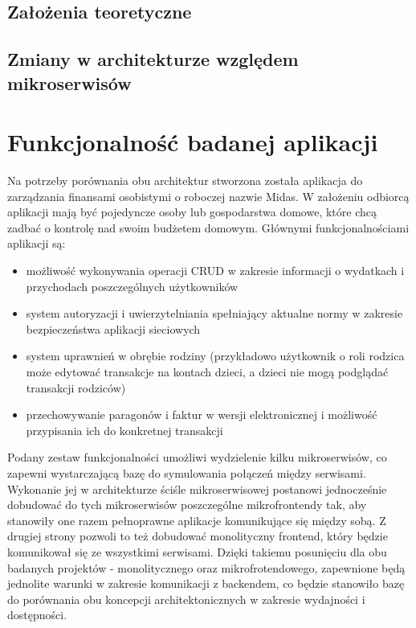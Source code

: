 \documentclass{SGGW-thesis}
\begin{document}
  \section{Założenia teoretyczne}
  \section{Zmiany w architekturze względem mikroserwisów}

\chapter{Funkcjonalność badanej aplikacji}
Na potrzeby porównania obu architektur stworzona została aplikacja do zarządzania finansami osobistymi o roboczej nazwie Midas. W założeniu odbiorcą aplikacji mają być pojedyncze osoby lub gospodarstwa domowe, które chcą zadbać o kontrolę nad swoim budżetem domowym. Głównymi funkcjonalnościami aplikacji są:

  \begin{itemize}
    \item możliwość wykonywania operacji CRUD w zakresie informacji o wydatkach i przychodach poszczególnych użytkowników
    \item system autoryzacji i uwierzytelniania spełniający aktualne normy w zakresie bezpieczeństwa aplikacji sieciowych
    \item system uprawnień w obrębie rodziny (przykładowo użytkownik o roli rodzica może edytować transakcje na kontach dzieci, a dzieci nie mogą podglądać transakcji rodziców)
    \item przechowywanie paragonów i faktur w wersji elektronicznej i możliwość przypisania ich do konkretnej transakcji
  \end{itemize}

Podany zestaw funkcjonalności umożliwi wydzielenie kilku mikroserwisów, co zapewni wystarczającą bazę do symulowania połączeń między serwisami. Wykonanie jej w architekturze ściśle mikroserwisowej postanowi jednocześnie dobudować do tych mikroserwisów poszczególne mikrofrontendy tak, aby stanowiły one razem pełnoprawne aplikacje komunikujące się między sobą. Z drugiej strony pozwoli to też dobudować monolityczny frontend, który będzie komunikował się ze wszystkimi serwisami. Dzięki takiemu posunięciu dla obu badanych projektów - monolitycznego oraz mikrofrotendowego, zapewnione będą jednolite warunki w zakresie komunikacji z backendem, co będzie stanowiło bazę do porównania obu koncepcji architektonicznych w zakresie wydajności i dostępności.
\end{document}
